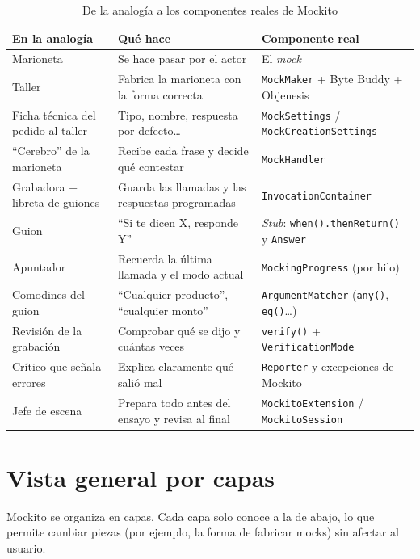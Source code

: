 \documentclass[11pt,a4paper,oneside]{report}
\newcommand{\code}[1]{\texttt{#1}}
\begin{document}
\begin{table}[H]
\centering
\caption{De la analogía a los componentes reales de Mockito}
\begin{tabularx}{\linewidth}{lXl}
\toprule
\textbf{En la analogía} & \textbf{Qué hace} & \textbf{Componente real}\\
\midrule
Marioneta & Se hace pasar por el actor & El \emph{mock}\\
Taller & Fabrica la marioneta con la forma correcta & \code{MockMaker} + Byte Buddy + Objenesis\\
Ficha técnica del pedido al taller & Tipo, nombre, respuesta por defecto\ldots & \code{MockSettings} / \code{MockCreationSettings}\\
``Cerebro'' de la marioneta & Recibe cada frase y decide qué contestar & \code{MockHandler}\\
Grabadora + libreta de guiones & Guarda las llamadas y las respuestas programadas & \code{InvocationContainer}\\
Guion & ``Si te dicen X, responde Y'' & \emph{Stub}: \code{when().thenReturn()} y \code{Answer}\\
Apuntador & Recuerda la última llamada y el modo actual & \code{MockingProgress} (por hilo)\\
Comodines del guion & ``Cualquier producto'', ``cualquier monto'' & \code{ArgumentMatcher} (\code{any()}, \code{eq()}\ldots)\\
Revisión de la grabación & Comprobar qué se dijo y cuántas veces & \code{verify()} + \code{VerificationMode}\\
Crítico que señala errores & Explica claramente qué salió mal & \code{Reporter} y excepciones de Mockito\\
Jefe de escena & Prepara todo antes del ensayo y revisa al final & \code{MockitoExtension} / \code{MockitoSession}\\
\bottomrule
\end{tabularx}
\end{table}

\section{Vista general por capas}
Mockito se organiza en capas. Cada capa solo conoce a la de abajo, lo que permite cambiar piezas (por ejemplo, la forma de fabricar mocks) sin afectar al usuario.
\end{document}
